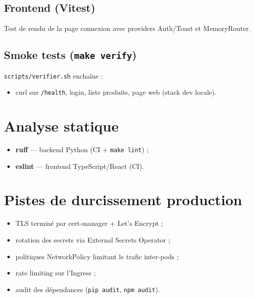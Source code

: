 \subsection{Frontend (Vitest)}

Test de rendu de la page connexion avec providers Auth/Toast et MemoryRouter.

\subsection{Smoke tests (\texttt{make verify})}

\texttt{scripts/verifier.sh} enchaîne :
\begin{itemize}
  \item curl sur \texttt{/health}, login, liste produits, page web (stack dev locale).
\end{itemize}

\section{Analyse statique}

\begin{itemize}
  \item \textbf{ruff} — backend Python (CI + \texttt{make lint}) ;
  \item \textbf{eslint} — frontend TypeScript/React (CI).
\end{itemize}

\section{Pistes de durcissement production}

\begin{itemize}
  \item TLS terminé par cert-manager + Let's Encrypt ;
  \item rotation des secrets via External Secrets Operator ;
  \item politiques NetworkPolicy limitant le trafic inter-pods ;
  \item rate limiting sur l'Ingress ;
  \item audit des dépendances (\texttt{pip audit}, \texttt{npm audit}).
\end{itemize}
